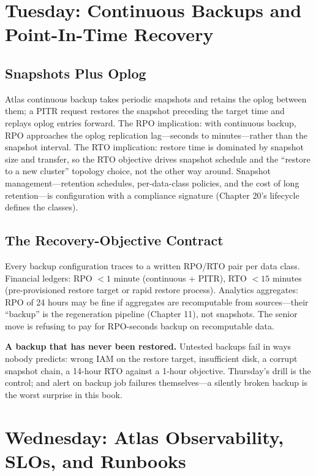 \section{Tuesday: Continuous Backups and Point-In-Time Recovery}
\subsection{Snapshots Plus Oplog}
Atlas continuous backup takes periodic snapshots and retains the oplog between them; a PITR request restores the snapshot preceding the target time and replays oplog entries forward. The RPO implication: with continuous backup, RPO approaches the oplog replication lag---seconds to minutes---rather than the snapshot interval. The RTO implication: restore time is dominated by snapshot size and transfer, so the RTO objective drives snapshot schedule and the ``restore to a new cluster'' topology choice, not the other way around. Snapshot management---retention schedules, per-data-class policies, and the cost of long retention---is configuration with a compliance signature (Chapter 20's lifecycle defines the classes).

\subsection{The Recovery-Objective Contract}
Every backup configuration traces to a written RPO/RTO pair per data class. Financial ledgers: RPO $< 1$ minute (continuous + PITR), RTO $< 15$ minutes (pre-provisioned restore target or rapid restore process). Analytics aggregates: RPO of 24 hours may be fine if aggregates are recomputable from sources---their ``backup'' is the regeneration pipeline (Chapter 11), not snapshots. The senior move is refusing to pay for RPO-seconds backup on recomputable data.

\begin{pitfall}
\textbf{A backup that has never been restored.} Untested backups fail in ways nobody predicts: wrong IAM on the restore target, insufficient disk, a corrupt snapshot chain, a 14-hour RTO against a 1-hour objective. Thursday's drill is the control; and alert on backup job failures themselves---a silently broken backup is the worst surprise in this book.
\end{pitfall}

\section{Wednesday: Atlas Observability, SLOs, and Runbooks}
